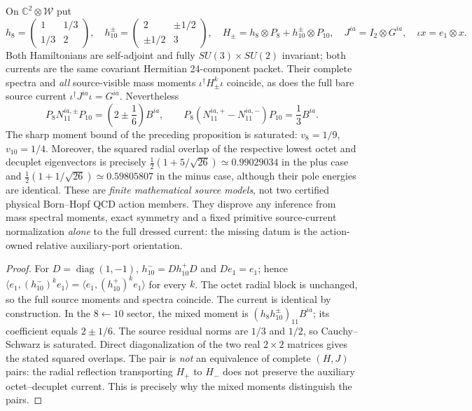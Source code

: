 \documentclass[12pt,a4paper]{article}
\begin{document}
\begin{theorem}
\label{p11:thm:v376-identical-mass-distinct-current-moments}
On $\mathbb C^2\otimes\mathcal W$ put
\[
 h_8=\begin{pmatrix}1&1/3\\1/3&2\end{pmatrix},\quad
 h_{10}^{\pm}=\begin{pmatrix}2&\pm1/2\\\pm1/2&3\end{pmatrix},
 \quad H_\pm=h_8\otimes P_8+h_{10}^\pm\otimes P_{10},
 \quad J^{ia}=I_2\otimes G^{ia},
 \quad \iota x=e_1\otimes x.
\]
Both Hamiltonians are self-adjoint and fully
$SU(3)\times SU(2)$ invariant; both currents are the same
covariant Hermitian 24-component packet. Their complete spectra
and \emph{all} source-visible mass moments
$\iota^\dagger H_\pm^k\iota$ coincide, as does the full
bare source current $\iota^\dagger J^{ia}\iota=G^{ia}$.
Nevertheless
\[
 \boxed{P_8N_{11}^{ia,\pm}P_{10}
 =\left(2\pm\frac16\right)B^{ia},\qquad
 P_8(N_{11}^{ia,+}-N_{11}^{ia,-})P_{10}
 =\frac13 B^{ia}.}
\]
The sharp moment bound of the preceding proposition is saturated:
$v_8=1/9$, $v_{10}=1/4$. Moreover, the squared radial overlap
of the respective lowest octet and decuplet eigenvectors is
precisely $\frac12(1+5/\sqrt{26})\simeq0.99029034$ in the
plus case and $\frac12(1+1/\sqrt{26})\simeq0.59805807$ in the
minus case, although their pole energies are identical.
These are \emph{finite mathematical source models}, not two
certified physical Born--Hopf QCD action members. They disprove
any inference from mass spectral moments, exact symmetry and a
fixed primitive source-current normalization \emph{alone} to
the full dressed current: the missing datum is the action-owned
relative auxiliary-port orientation.
\end{theorem}
\begin{proof}
For $D=\operatorname{diag}(1,-1)$,
$h_{10}^-=Dh_{10}^+D$ and $De_1=e_1$; hence
$\langle e_1,(h_{10}^-)^ke_1\rangle=
\langle e_1,(h_{10}^+)^ke_1\rangle$ for every $k$.
The octet radial block is unchanged, so the full source moments
and spectra coincide. The current is identical by construction.
In the $8\leftarrow10$ sector, the mixed moment is
$(h_8h_{10}^{\pm})_{11}B^{ia}$; its coefficient equals
$2\pm1/6$. The source residual norms are $1/3$ and $1/2$,
so Cauchy--Schwarz is saturated. Direct diagonalization of the
two real $2\times2$ matrices gives the stated squared overlaps.
The pair is \emph{not} an equivalence of complete $(H,J)$ pairs:
the radial reflection transporting $H_+$ to $H_-$ does not
preserve the auxiliary octet--decuplet current. This is precisely
why the mixed moments distinguish the pairs.
\end{proof}
\end{document}
